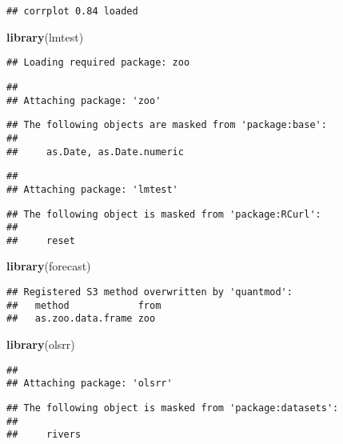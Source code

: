 \documentclass[
]{article}
\newenvironment{Shaded}{\begin{snugshade}}{\end{snugshade}}
\newcommand{\KeywordTok}[1]{\textcolor[rgb]{0.13,0.29,0.53}{\textbf{#1}}}
\newcommand{\NormalTok}[1]{#1}
\begin{document}
\begin{verbatim}
## corrplot 0.84 loaded
\end{verbatim}

\begin{Shaded}
\begin{Highlighting}[]
\KeywordTok{library}\NormalTok{(lmtest)}
\end{Highlighting}
\end{Shaded}

\begin{verbatim}
## Loading required package: zoo
\end{verbatim}

\begin{verbatim}
## 
## Attaching package: 'zoo'
\end{verbatim}

\begin{verbatim}
## The following objects are masked from 'package:base':
## 
##     as.Date, as.Date.numeric
\end{verbatim}

\begin{verbatim}
## 
## Attaching package: 'lmtest'
\end{verbatim}

\begin{verbatim}
## The following object is masked from 'package:RCurl':
## 
##     reset
\end{verbatim}

\begin{Shaded}
\begin{Highlighting}[]
\KeywordTok{library}\NormalTok{(forecast)}
\end{Highlighting}
\end{Shaded}

\begin{verbatim}
## Registered S3 method overwritten by 'quantmod':
##   method            from
##   as.zoo.data.frame zoo
\end{verbatim}

\begin{Shaded}
\begin{Highlighting}[]
\KeywordTok{library}\NormalTok{(olsrr)}
\end{Highlighting}
\end{Shaded}

\begin{verbatim}
## 
## Attaching package: 'olsrr'
\end{verbatim}

\begin{verbatim}
## The following object is masked from 'package:datasets':
## 
##     rivers
\end{verbatim}
\end{document}
